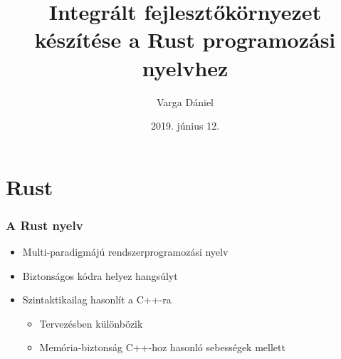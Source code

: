 \documentclass{beamer}
\title[IDE készítése a Rust-hoz]{Integrált fejlesztőkörnyezet készítése a Rust programozási nyelvhez}
\author{Varga Dániel}
\institute{Miskolci Egyetem}
\date{2019. június 12.}
\begin{document}
    \frame{\titlepage}

    \section{Rust}

    \begin{frame}[fragile]
        \frametitle{A Rust nyelv}

        \begin{itemize}
            \item Multi-paradigmájú rendszerprogramozási nyelv
            \item Biztonságos kódra helyez hangsúlyt
            \item Szintaktikailag hasonlít a C++-ra \begin{itemize}
                \item Tervezésben különbözik
                \item Memória-biztonság C++-hoz hasonló sebességek mellett
            \end{itemize}
        \end{itemize}

    \end{frame}
\end{document}
